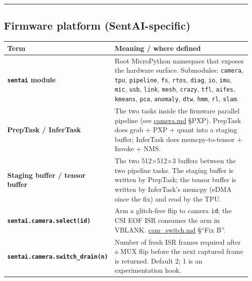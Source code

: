 \begin{center}\rule{0.5\linewidth}{0.5pt}\end{center}

\subsection{Firmware platform
(SentAI-specific)}\label{firmware-platform-sentai-specific}

{\def\LTcaptype{none} %
\begin{longtable}[]{@{}
  >{\raggedright\arraybackslash}p{}
  >{\raggedright\arraybackslash}p{}@{}}
\toprule\noalign{}
\begin{minipage}[b]{\linewidth}\raggedright
Term
\end{minipage} & \begin{minipage}[b]{\linewidth}\raggedright
Meaning / where defined
\end{minipage} \\
\midrule\noalign{}
\endhead
\bottomrule\noalign{}
\endlastfoot
\textbf{\texttt{sentai} module} & Root MicroPython namespace that
exposes the hardware surface. Submodules: \texttt{camera}, \texttt{tpu},
\texttt{pipeline}, \texttt{fs}, \texttt{rtos}, \texttt{diag},
\texttt{io}, \texttt{imu}, \texttt{mic}, \texttt{usb}, \texttt{link},
\texttt{mesh}, \texttt{crazy}, \texttt{tfl}, \texttt{aifes},
\texttt{kmeans}, \texttt{pca}, \texttt{anomaly}, \texttt{dtw},
\texttt{hmm}, \texttt{rl}, \texttt{slam}. \\
\textbf{PrepTask / InferTask} & The two tasks inside the firmware
parallel pipeline (see \url{camera.md} §PXP). PrepTask does grab + PXP +
quant into a staging buffer; InferTask does memcpy-to-tensor + Invoke +
NMS. \\
\textbf{Staging buffer / tensor buffer} & The two 512×512×3 buffers
between the two pipeline tasks. The staging buffer is written by
PrepTask; the tensor buffer is written by InferTask's memcpy (eDMA since
the fix) and read by the TPU. \\
\textbf{\texttt{sentai.camera.select(id)}} & Arm a glitch-free flip to
camera \texttt{id}; the CSI EOF ISR consumes the arm in VBLANK.
\url{cam_switch.md} §``Fix B''. \\
\textbf{\texttt{sentai.camera.switch\_drain(n)}} & Number of fresh ISR
frames required after a MUX flip before the next captured frame is
returned. Default 2; 1 is an experimentation hook. \\

\end{longtable}}
